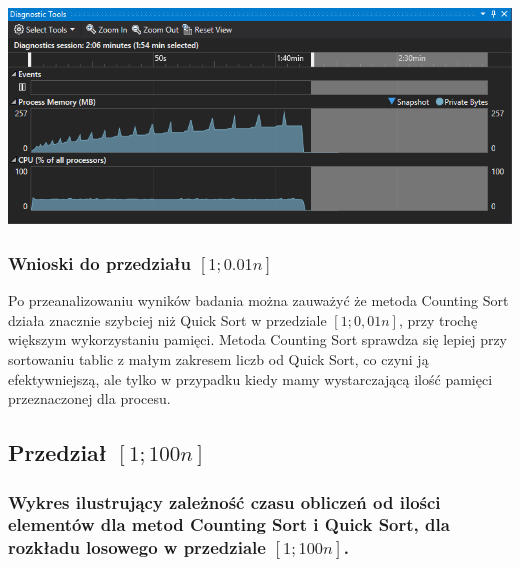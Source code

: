 \documentclass[polish,polish,a4paper]{article}
\begin{document}
\begin{spacing}{1.5}
	\begin{minipage}[H]{\textwidth}
	\begin{center}
		\includegraphics[scale=0.85]{zad4pamiec001n.png}
		\label{fig:zad4pamiec001n}
	\end{center}
	\end{minipage}

\subsubsection{Wnioski do przedziału $[1;0.01n]$}

Po przeanalizowaniu wyników badania można zauważyć że metoda Counting Sort działa znacznie szybciej niż Quick Sort w przedziale $[1;0,01n]$, przy trochę większym wykorzystaniu pamięci. Metoda Counting Sort sprawdza się lepiej przy sortowaniu tablic z małym zakresem liczb od Quick Sort, co czyni ją efektywniejszą, ale tylko w przypadku kiedy mamy wystarczającą ilość pamięci przeznaczonej dla procesu.

\subsection{Przedział $[1;100n]$}

\subsubsection*{Wykres ilustrujący zależność czasu obliczeń od ilości elementów dla metod Counting Sort i  Quick Sort, dla rozkładu losowego w przedziale $[1;100n]$.}


\end{spacing}
\end{document}
